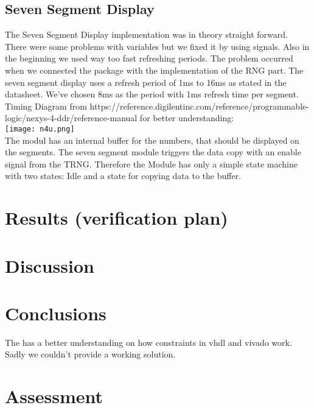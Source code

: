 \documentclass[%
	a4paper,
]
{article}
\begin{document}
\subsection{Seven Segment Display}
The Seven Segment Display implementation was in theory straight forward. There were some problems with variables but we fixed it by using signals. Also in the beginning we used way too fast refreshing periods. The problem occurred when we connected the package with the implementation of the RNG part.
The seven segment display uses a refresh period of 1ms to 16ms as stated in the datasheet. We've chosen 8ms as the period with 1ms refresh time per segment. Timing Diagram from https://reference.digilentinc.com/reference/programmable-logic/nexys-4-ddr/reference-manual for better understanding: \\
\texttt{[image: n4u.png]}\\
The modul has an internal buffer for the numbers, that should be displayed on the segments. The seven segment module triggers the data copy with an enable signal from the TRNG. Therefore the Module has only a simple state machine with two states: Idle and a state for copying data to the buffer.

%
%
\section{Results (verification plan)}
\label{sec:results}




%
%
\section{Discussion}
\label{sec:discussion}


%
%
\section{Conclusions}
\label{sec:conclusions}

The has a better understanding on how constraints in vhdl and vivado work. 
Sadly we couldn't provide a working solution.
%
%
\pagebreak
\section{Assessment}
\label{sec:assessment}
\end{document}
